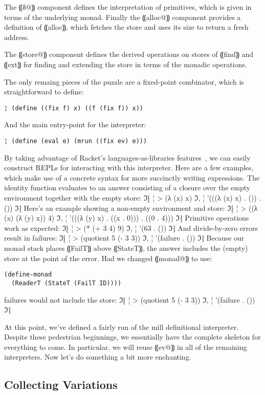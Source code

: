The ⸨δ@⸩ component defines the interpretation of primitives,
which is given in terms of the underlying monad.  Finally the
⸨alloc@⸩ component provides a definition of ⸨alloc⸩,
which fetches the store and uses its size to return a fresh address.

The ⸨store@⸩ component defines the derived operations on stores
of ⸨find⸩ and ⸨ext⸩ for finding and extending the store
in terms of the monadic operations.

The only remaing pieces of the puzzle are a fixed-point combinator,
which is straightforward to define:
\begin{lstlisting}
¦ (define ((fix f) x) ((f (fix f)) x))
\end{lstlisting}
And the main entry-point for the interpreter:
\begin{lstlisting}
¦ (define (eval e) (mrun ((fix ev) e)))
\end{lstlisting}

By taking advantage of Racket's languages-as-libraries
features~\cite{dvanhorn:TobinHochstadt2011Languages}, we can easily construct
REPLs for interacting with this interpreter.  Here are a few examples, which
make use of a concrete syntax for more succinctly writing expressions. The
identity function evaluates to an answer consisting of a closure over the empty
environment together with the empty store:
ℑ⁅
¦ > (λ (x) x)
ℑ,
¦ '(((λ (x) x) . ()) . ())
ℑ⁆
Here's an example showing a non-empty environment and store:
ℑ⁅
¦ > ((λ (x) (λ (y) x)) 4)
ℑ,
¦ '(((λ (y) x) . ((x . 0))) . ((0 . 4)))
ℑ⁆
Primitive operations work as expected:
ℑ⁅
¦ > (* (+ 3 4) 9)
ℑ,
¦ '(63 . ())
ℑ⁆
And divide-by-zero errors result in failures:
ℑ⁅
¦ > (quotient 5 (- 3 3))
ℑ,
¦ '(failure . ())
ℑ⁆
Because our monad stack places ⸨FailT⸩ above ⸨StateT⸩,
the answer includes the (empty) store at the point of the error.
Had we changed ⸨monad@⸩ to use:
\begin{lstlisting}
(define-monad 
  (ReaderT (StateT (FailT ID))))
\end{lstlisting}
failures would not include the store:
ℑ⁅
¦ > (quotient 5 (- 3 3))
ℑ,
¦ '(failure . ())
ℑ⁆

At this point, we've defined a fairly run of the mill definitional
interpreter.  Despite these pedestrian beginnings, we essentially have
the complete skeleton for everything to come.  In particular, we will
reuse ⸨ev@⸩ in all of the remaining interpreters.  Now let's do
something a bit more enchanting.

\subsection{Collecting Variations}\label{s:collecting}

